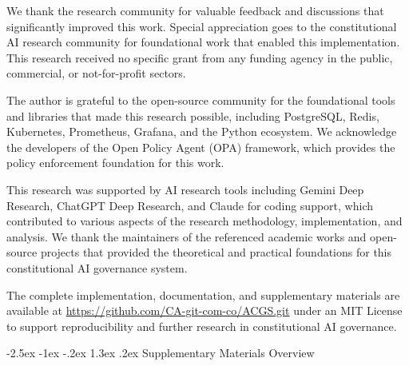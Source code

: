 \documentclass[manuscript,screen,9pt]{acmart}
\makeatletter
\renewcommand\section{\@startsection{section}{1}{\z@}%
  {-2.5ex \@plus -1ex \@minus -.2ex}%
  {1.3ex \@plus.2ex}%
  {\normalfont\Large\bfseries}}
\makeatother
\begin{document}
\begin{acks}
We thank the research community for valuable feedback and discussions that significantly improved this work. Special appreciation goes to the constitutional AI research community for foundational work that enabled this implementation. This research received no specific grant from any funding agency in the public, commercial, or not-for-profit sectors.

The author is grateful to the open-source community for the foundational tools and libraries that made this research possible, including PostgreSQL, Redis, Kubernetes, Prometheus, Grafana, and the Python ecosystem. We acknowledge the developers of the Open Policy Agent (OPA) framework, which provides the policy enforcement foundation for this work.

This research was supported by AI research tools including Gemini Deep Research, ChatGPT Deep Research, and Claude for coding support, which contributed to various aspects of the research methodology, implementation, and analysis. We thank the maintainers of the referenced academic works and open-source projects that provided the theoretical and practical foundations for this constitutional AI governance system.

The complete implementation, documentation, and supplementary materials are available at \url{https://github.com/CA-git-com-co/ACGS.git} under an MIT License to support reproducibility and further research in constitutional AI governance.
\end{acks}





\appendix

\section{Supplementary Materials Overview} 
\label{app:supplementary}
\end{document}

